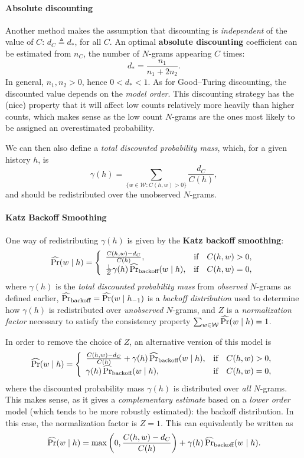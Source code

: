 \paragraph{Absolute discounting} Another method makes the assumption that discounting is \emph{independent} of the value of \(C\): \(d_C \triangleq d_*\), for all \(C\).
An optimal \textbf{absolute discounting} coefficient can be estimated from \(n_C\), the number of \(N\)-grams appearing \(C\) times:
\[
d_* = \frac{n_1}{n_1 + 2n_2}.
\]
In general, \(n_1, n_2 > 0\), hence \(0 < d_* < 1\).
As for Good--Turing discounting, the discounted value depends on the \emph{model order}.
This discounting strategy has the (nice) property that it will affect low counts relatively more heavily than higher counts, which makes sense as the low count \(N\)-grams are the ones most likely to be assigned an overestimated probability.

We can then also define a \emph{total discounted probability mass}, which, for a given history \(h\), is
\[
\gamma(h) = \sum_{\{w \in \mathcal{W}: C(h, w) > 0\}} \frac{d_C}{C(h)},
\]
and should be redistributed over the unobserved \(N\)-grams.

\paragraph{Katz Backoff Smoothing} One way of redistributing \(\gamma(h)\) is given by the \textbf{Katz backoff smoothing}:
\[
\Prhat(w \mid h) = \left\{\begin{array}{l@{\quad}l}
\frac{C(h, w) - d_C}{C(h)}, & \textnormal{if} \quad C(h, w) > 0,\\
\frac{1}{Z} \gamma(h) \Prhat_{\textnormal{backoff}}(w \mid h), & \textnormal{if} \quad C(h, w) = 0,
\end{array}\right.
\]
where \(\gamma(h)\) is the \emph{total discounted probability mass} from \emph{observed} \(N\)-grams as defined earlier, \(\operatorname{\widehat{\Pr}}_{\textnormal{backoff}} = \operatorname{\widehat{\Pr}}(w \mid h_{-1})\) is a \emph{backoff distribution} used to determine how \(\gamma(h)\) is redistributed over \emph{unobserved} \(N\)-grams, and \(Z\) is a \emph{normalization factor} necessary to satisfy the consistency property \(\sum_{w \in \mathcal{W}} \operatorname{\widehat{\Pr}}(w \mid h) = 1\).

In order to remove the choice of \(Z\), an alternative version of this model is
\[
\Prhat(w \mid h) = \left\{\begin{array}{l@{\quad}l}
\frac{C(h, w) - d_C}{C(h)} + \gamma(h)\Prhat_{\textnormal{backoff}}(w \mid h), & \textnormal{if} \quad C(h, w) > 0,\\
\gamma(h) \Prhat_{\textnormal{backoff}}(w \mid h), & \textnormal{if} \quad C(h, w) = 0,
\end{array}\right.
\]
where the discounted probability mass \(\gamma(h)\) is distributed over \emph{all} \(N\)-grams.
This makes sense, as it gives a \emph{complementary estimate} based on a \emph{lower order} model (which tends to be more robustly estimated): the backoff distribution.
In this case, the normalization factor is \(Z = 1\).
This can equivalently be written as
\[
\operatorname{\widehat{\Pr}}(w \mid h) = \max\left(0, \frac{C(h, w) - d_C}{C(h)}\right) + \gamma(h)\operatorname{\widehat{\Pr}}_{\textnormal{backoff}}(w \mid h).
\]

